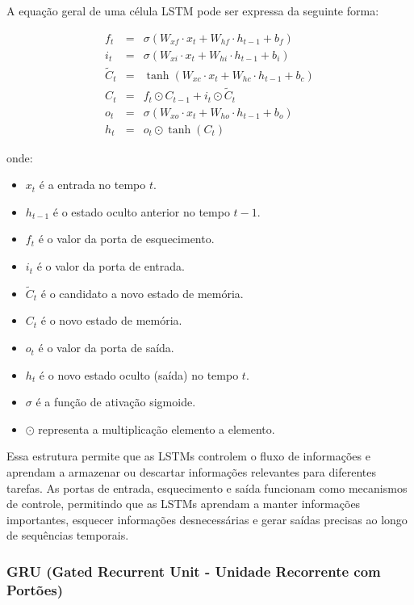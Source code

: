 A equação geral de uma célula LSTM pode ser expressa da seguinte forma:


\begin{eqnarray}
	f_t &=& \sigma(W_{xf} \cdot x_t + W_{hf} \cdot h_{t-1} + b_f) \\
	i_t &=& \sigma(W_{xi} \cdot x_t + W_{hi} \cdot h_{t-1} + b_i) \\
	\tilde{C}_t &=& \tanh(W_{xc} \cdot x_t + W_{hc} \cdot h_{t-1} + b_c) \\
	C_t &=& f_t \odot C_{t-1} + i_t \odot \tilde{C}_t \\
	o_t &=& \sigma(W_{xo} \cdot x_t + W_{ho} \cdot h_{t-1} + b_o) \\
	h_t &=& o_t \odot \tanh(C_t)
\end{eqnarray}


onde:
\begin{itemize}
	\item \(x_t\) é a entrada no tempo \(t\).
	\item \(h_{t-1}\) é o estado oculto anterior no tempo \(t-1\).
	\item \(f_t\) é o valor da porta de esquecimento.
	\item \(i_t\) é o valor da porta de entrada.
	\item \(\tilde{C}_t\) é o candidato a novo estado de memória.
	\item \(C_t\) é o novo estado de memória.
	\item \(o_t\) é o valor da porta de saída.
	\item \(h_t\) é o novo estado oculto (saída) no tempo \(t\).
	\item \(\sigma\) é a função de ativação sigmoide.
	\item \(\odot\) representa a multiplicação elemento a elemento.
\end{itemize}

Essa estrutura permite que as LSTMs controlem o fluxo de informações e aprendam a armazenar ou descartar informações relevantes para diferentes tarefas. As portas de entrada, esquecimento e saída funcionam como mecanismos de controle, permitindo que as LSTMs aprendam a manter informações importantes, esquecer informações desnecessárias e gerar saídas precisas ao longo de sequências temporais.

\subsubsection{GRU (Gated Recurrent Unit - Unidade Recorrente com Port\~oes)}



